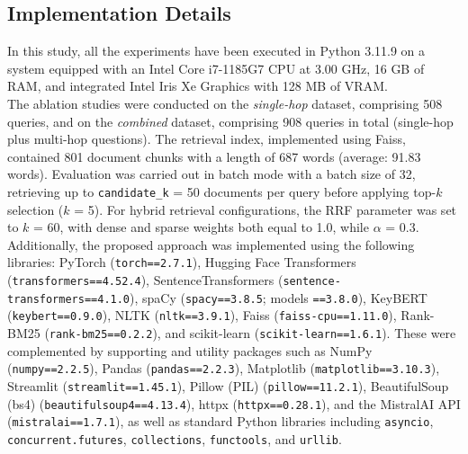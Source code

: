 \documentclass[a4paper,12pt, openany]{book}  %
\begin{document}
\clearpage
\begin{appendices}
    \chapter{Implementation Details}
    \label{appendix:A}

In this study, all the experiments have been executed in Python 3.11.9 on a system equipped with an Intel Core i7-1185G7 CPU at 3.00 GHz, 16 GB of RAM, and integrated Intel Iris Xe Graphics with 128 MB of VRAM.\\ 


\noindent The ablation studies were conducted on the \textit{single-hop} dataset, comprising 508 queries, and on the \textit{combined} dataset, comprising 908 queries in total (single-hop plus multi-hop questions). The retrieval index, implemented using Faiss, contained 801 document chunks with a length of 687 words (average: 91.83 words). Evaluation was carried out in batch mode with a batch size of 32, retrieving up to \texttt{candidate\_k} = 50 documents per query before applying top-$k$ selection ($k$ = 5). For hybrid retrieval configurations, the RRF parameter was set to $k$ = 60, with dense and sparse weights both equal to 1.0, while $\alpha$ = 0.3.\\

\noindent Additionally, the proposed approach was implemented using the following libraries: PyTorch (\texttt{torch==2.7.1}), Hugging Face Transformers (\texttt{transformers==4.52.4}), SentenceTransformers (\texttt{sentence-transformers==4.1.0}), spaCy (\texttt{spacy==3.8.5}; models \texttt{==3.8.0}), KeyBERT (\texttt{keybert==0.9.0}), NLTK (\texttt{nltk==3.9.1}), Faiss (\texttt{faiss-cpu==1.11.0}), Rank-BM25 (\texttt{rank-bm25==0.2.2}), and scikit-learn (\texttt{scikit-learn==1.6.1}). These were complemented by supporting and utility packages such as NumPy (\texttt{numpy==2.2.5}), Pandas (\texttt{pandas==2.2.3}), Matplotlib (\texttt{matplotlib==3.10.3}), Streamlit (\texttt{streamlit==1.45.1}), Pillow (PIL) (\texttt{pillow==11.2.1}), BeautifulSoup (bs4) (\texttt{beautifulsoup4==4.13.4}), httpx (\texttt{httpx==0.28.1}), and the MistralAI API (\texttt{mistralai==1.7.1}), as well as standard Python libraries including \texttt{asyncio}, \texttt{concurrent.futures}, \texttt{collections}, \texttt{functools}, and \texttt{urllib}.





\end{appendices}

\sloppy
\backmatter
\pagestyle{fancy}

{}
\printbibliography
\end{document}
